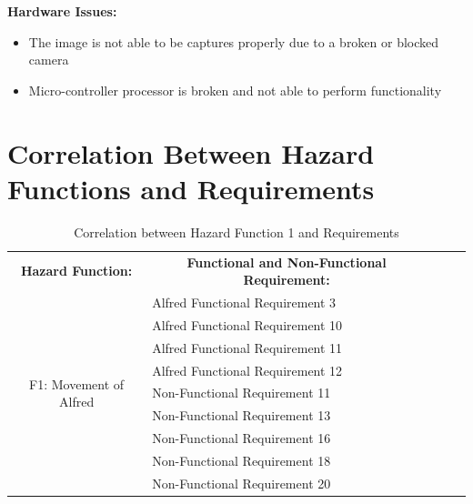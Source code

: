 \documentclass [10pt]{article}
\begin{document}
	\textbf{Hardware Issues:}
		\begin {itemize}
			\item The image is not able to be captures properly due to a broken or blocked camera
			\item Micro-controller processor is broken and not able to perform functionality
		\end {itemize}


\pagebreak 



\section{Correlation Between Hazard Functions and  Requirements}


\begin{table}[H]
\centering
\begin{tabular}{|c|l|lll}
\cline{1-2}
\textbf{Hazard Function:} & \multicolumn{1}{c|}{\textbf{Functional and Non-Functional Requirement:}} &  &  &  \\ \cline{1-2}
\multirow{9}{*}{F1: Movement of Alfred} 
				& Alfred Functional Requirement 3		&  &  &  \\ \cline{2-2}
                                  & Alfred Functional Requirement 10		&  &  &  \\ \cline{2-2}
                                  & Alfred Functional Requirement 11		&  &  &  \\ \cline{2-2}
                                  & Alfred Functional Requirement 12		&  &  &  \\ \cline{2-2}
                                  & Non-Functional Requirement 11		&  &  &  \\ \cline{2-2}
                                  & Non-Functional Requirement 13 		&  &  &  \\ \cline{2-2}
                                  & Non-Functional Requirement 16 		&  &  &  \\ \cline{2-2}
                                  & Non-Functional Requirement 18		&  &  &  \\ \cline{2-2}
                                  & Non-Functional Requirement 20		&  &  &  \\ \cline{1-2}
\end{tabular}
\caption{Correlation between Hazard Function 1 and Requirements}  
\end{table}
\end{document}

